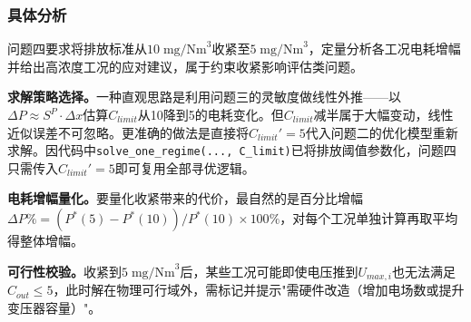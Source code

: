 
\subsubsection{具体分析}

问题四要求将排放标准从$10\;\text{mg/Nm}^3$收紧至$5\;\text{mg/Nm}^3$，定量分析各工况电耗增幅并给出高浓度工况的应对建议，属于约束收紧影响评估类问题。

\textbf{求解策略选择。}一种直观思路是利用问题三的灵敏度做线性外推——以$\Delta P\approx S^P\cdot\Delta x$估算$C_{limit}$从10降到5的电耗变化。但$C_{limit}$减半属于大幅变动，线性近似误差不可忽略。更准确的做法是直接将$C_{limit}'=5$代入问题二的优化模型重新求解。因代码中\texttt{solve\_one\_regime(...,\,C\_limit)}已将排放阈值参数化，问题四只需传入$C_{limit}'=5$即可复用全部寻优逻辑。

\textbf{电耗增幅量化。}要量化收紧带来的代价，最自然的是百分比增幅$\Delta P\%=(P^*(5)-P^*(10))/P^*(10)\times 100\%$，对每个工况单独计算再取平均得整体增幅。

\textbf{可行性校验。}收紧到$5\;\text{mg/Nm}^3$后，某些工况可能即使电压推到$U_{max,i}$也无法满足$C_{out}\leq 5$，此时解在物理可行域外，需标记并提示"需硬件改造（增加电场数或提升变压器容量）"。
